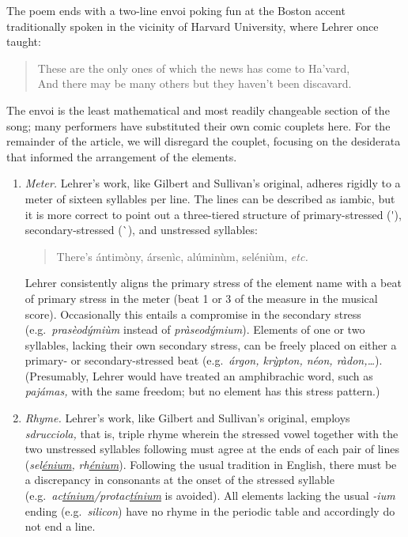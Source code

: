 \documentclass{article}
\begin{document}
The poem ends with a two-line envoi poking fun at the Boston accent traditionally spoken in the vicinity of Harvard University, where Lehrer once taught:
\begin{verse}
  These are the only ones of which the news has come to Ha'vard,\\
  And there may be many others but they haven't been discavard.
\end{verse}
The envoi is the least mathematical and most readily changeable section of the song; many performers have substituted their own comic couplets here. For the remainder of the article, we will disregard the couplet, focusing on the desiderata that informed the arrangement of the elements.

\begin{enumerate}
  \item \emph{Meter.} Lehrer's work, like Gilbert and Sullivan's original, adheres rigidly to a meter of sixteen syllables per line. The lines can be described as iambic, but it is more correct to point out a three-tiered structure of primary-stressed (\'{}), secondary-stressed (\`{}), and unstressed syllables:
  \begin{verse}
    There's \'antim\`ony, \'arsen\`ic, al\'umin\`um, sel\'eni\`um, \emph{etc.}
  \end{verse}
  Lehrer consistently aligns the primary stress of the element name with a beat of primary stress in the meter (beat 1 or 3 of the measure in the musical score). Occasionally this entails a compromise in the secondary stress (e.g.\ \emph{pras\`eod\'ymi\`um} instead of \emph{pr\`aseod\'ymium}). Elements of one or two syllables, lacking their own secondary stress, can be freely placed on either a primary- or secondary-stressed beat (e.g.\ \emph{\'argon, kr\`ypton, n\'eon, r\`adon,\dots}). (Presumably, Lehrer would have treated an amphibrachic word, such as \emph{paj\'amas,} with the same freedom; but no element has this stress pattern.)
  
  \item \emph{Rhyme.} Lehrer's work, like Gilbert and Sullivan's original, employs \emph{sdrucciola,} that is, triple rhyme wherein the stressed vowel together with the two unstressed syllables following must agree at the ends of each pair of lines (\emph{sel\underline{\'enium},} \emph{rh\underline{\'enium}}). Following the usual tradition in English, there must be a discrepancy in consonants at the onset of the stressed syllable (e.g.\ \emph{ac\underline{t\'inium}/protac\underline{t\'inium}} is avoided). All elements lacking the usual \emph{-ium} ending (e.g.\ \emph{silicon}) have no rhyme in the periodic table and accordingly do not end a line.
  

\end{enumerate}
\end{document}
